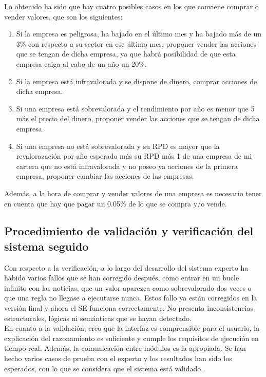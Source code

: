 \documentclass[12pt]{article}
\begin{document}
Lo obtenido ha sido que hay cuatro posibles casos en los que conviene comprar o vender valores, que son los siguientes:
\begin{enumerate}
\item Si la empresa es peligrosa, ha bajado en el último mes y ha bajado más de un 3\% con respecto a su sector en ese último mes, proponer vender las acciones que se tengan de dicha empresa, ya que habrá posibilidad de que esta empresa caiga al cabo de un año un 20\%.
\item Si la empresa está infravalorada y se dispone de dinero, comprar acciones de dicha empresa.
\item Si una empresa está sobrevalorada y el rendimiento por año es menor que 5 más el precio del dinero, proponer vender las acciones que se tengan de dicha empresa.
\item Si una empresa no está sobrevalorada y su RPD es mayor que la revalorazación por año esperado más su RPD más 1 de una empresa de mi cartera que no está infravalorada y no poseo ya acciones de la primera empresa, proponer cambiar las acciones de las empresas.
\end{enumerate}

Además, a la hora de comprar y vender valores de una empresa es necesario tener en cuenta que hay que pagar un 0.05\% de lo que se compra y/o vende.

\subsection{Procedimiento de validación y verificación del sistema seguido}
Con respecto a la verificación, a lo largo del desarrollo del sistema experto ha habido varios fallos que se han corregido después, como entrar en un bucle infinito con las noticias, que un valor aparezca como sobrevalorado dos veces o que una regla no llegase a ejecutarse nunca. Estos fallo ya están corregidos en la versión final y ahora el SE funciona correctamente. No presenta inconsistencias estructurales, lógicas ni semánticas que se hayan detectado.\\

En cuanto a la validación, creo que la interfaz es comprensible para el usuario, la explicación del razonamiento es suficiente y cumple los requisitos de ejecución en tiempo real. Además, la comunicación entre módulos es la apropiada. Se han hecho varios casos de prueba con el experto y los resultados han sido los esperados, con lo que se considera que el sistema está validado.
\end{document}
